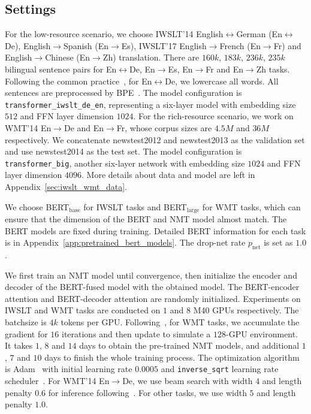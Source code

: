 \documentclass{article} \usepackage{iclr2020_conference,times}
\begin{document}
\subsection{Settings}\label{sec:sup_nmt:setting}
 For the low-resource scenario, we choose IWSLT'14 English$\leftrightarrow$German (En$\leftrightarrow$De), English$\to$Spanish (En$\to$Es), IWSLT'17 English$\to$French (En$\to$Fr) and English$\to$Chinese (En$\to$Zh) translation. There are $160k$, $183k$, $236k$, $235k$ bilingual sentence pairs for En$\leftrightarrow$De, En$\to$Es, En$\to$Fr and En$\to$Zh tasks. Following the common practice~\citep{edunov2018classical}, for En$\leftrightarrow$De, we lowercase all words. All sentences are preprocessed by BPE~\citep{sennrich2016neural}. The model configuration is \texttt{transformer\_iwslt\_de\_en}, representing a six-layer model with embedding size $512$ and FFN layer dimension $1024$. For the rich-resource scenario, we work on WMT'14 En$\to$De and En$\to$Fr, whose corpus sizes are $4.5M$ and $36M$ respectively. We concatenate newstest2012 and newstest2013 as the validation set and use newstest2014 as the test set. The model configuration is \texttt{transformer\_big}, another six-layer network with embedding size $1024$ and FFN layer dimension $4096$.   More details about data and model  are left in Appendix~\ref{sec:iwslt_wmt_data}.

We choose BERT$_{\text{base}}$ for IWSLT tasks and BERT$_{\text{large}}$ for WMT tasks, which can ensure that the dimension of the BERT and NMT model almost match. The BERT models are fixed during training. Detailed BERT information for each task is in Appendix~\ref{app:pretrained_bert_models}. The drop-net rate $p_{\text{net}}$ is set as $1.0$.


 We first train an NMT model until convergence, then initialize the encoder and decoder of the BERT-fused model  with the obtained model. The BERT-encoder attention and BERT-decoder attention are randomly initialized. Experiments on IWSLT and WMT tasks are conducted on $1$ and $8$ M40 GPUs respectively. The batchsize is $4k$ tokens per GPU. Following~\citep{ott2018scaling}, for WMT tasks, we accumulate the gradient for $16$ iterations and then update to simulate a $128$-GPU environment. It takes $1$, $8$ and $14$ days to obtain the pre-trained NMT models, and additional $1$, $7$ and $10$ days to finish the whole training process. The optimization algorithm is Adam~\citep{kingma2014adam} with initial learning rate $0.0005$ and \texttt{inverse\_sqrt} learning rate scheduler~\citep{vaswani2017attention}. For WMT'14 En$\to$De, we use beam search with width $4$ and length penalty $0.6$ for inference following~\citep{vaswani2017attention}. For other tasks, we use width $5$ and length penalty $1.0$.
\end{document}
